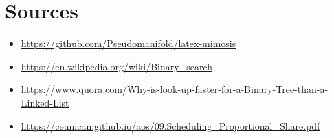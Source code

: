 \chapter{Sources}
\begin{itemize}
    \item \url{https://github.com/Pseudomanifold/latex-mimosis}
    \item \url{https://en.wikipedia.org/wiki/Binary_search}
    \item \url{https://www.quora.com/Why-is-look-up-faster-for-a-Binary-Tree-than-a-Linked-List}
    \item \url{https://ceunican.github.io/aos/09.Scheduling_Proportional_Share.pdf}
\end{itemize}